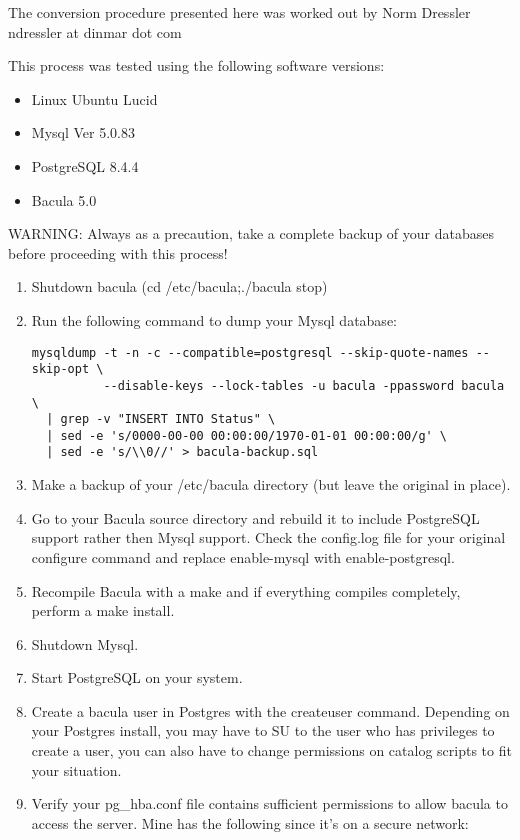 The conversion procedure presented here was worked out by Norm Dressler
\lt{}ndressler at dinmar dot com\gt{} 

This process was tested using the following software versions: 

\begin{itemize}
\item Linux Ubuntu Lucid
\item Mysql Ver 5.0.83
\item PostgreSQL 8.4.4
\item Bacula 5.0
   \end{itemize}

WARNING: Always as a precaution, take a complete backup of your databases
before proceeding with this process! 

\begin{enumerate}
\item Shutdown bacula (cd /etc/bacula;./bacula stop)  
\item Run the following command to dump your Mysql database:  

   \footnotesize
\begin{verbatim}
mysqldump -t -n -c --compatible=postgresql --skip-quote-names --skip-opt \
          --disable-keys --lock-tables -u bacula -ppassword bacula \
  | grep -v "INSERT INTO Status" \
  | sed -e 's/0000-00-00 00:00:00/1970-01-01 00:00:00/g' \
  | sed -e 's/\\0//' > bacula-backup.sql    
\end{verbatim}
\normalsize

\item Make a backup of your /etc/bacula directory (but leave the  original in
   place).  
\item Go to your Bacula source directory and rebuild it to include  PostgreSQL
   support rather then Mysql support. Check the  config.log file for your
   original configure command and replace  enable-mysql with enable-postgresql.  
\item Recompile Bacula with a make and if everything compiles  completely,
   perform a make install.  
\item Shutdown Mysql. 
\item Start PostgreSQL on your system.  
\item Create a bacula user in Postgres with the createuser command.  Depending on
   your Postgres install, you may have to SU to the  user who has privileges to
   create a user, you can also have to change permissions on catalog scripts
   to fit your situation.  
\item Verify your pg\_hba.conf file contains sufficient permissions to  allow
   bacula to access the server. Mine has the following since  it's on a secure
   network:  


\end{enumerate}
